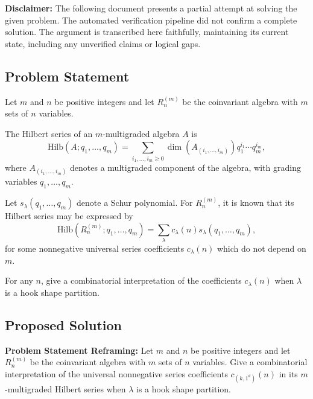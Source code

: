 \documentclass[12pt]{article}
\begin{document}

\date{}



\begin{center}
    \textbf{Disclaimer:} The following document presents a partial attempt at solving the given problem. The automated verification pipeline did not confirm a complete solution. The argument is transcribed here faithfully, maintaining its current state, including any unverified claims or logical gaps.
\end{center}

\subsection*{Problem Statement}

Let $m$ and $n$ be positive integers and let $R_n^{(m)}$ be the coinvariant algebra with $m$ sets of $n$ variables.

The Hilbert series of an $m$-multigraded algebra $A$ is
\[
\mathrm{Hilb}(A;q_1,\ldots ,q_m)= \sum_{i_1,\ldots,i_m \geq 0} \dim(A_{(i_1,\ldots,i_m)})q_1^{i_1} \cdots q_m^{i_m},
\]
where $A_{(i_1,\ldots,i_m)}$ denotes a multigraded component of the algebra, with grading variables $q_1,\ldots, q_m$.

Let $s_\lambda(q_1,\ldots ,q_m)$ denote a Schur polynomial. For $R_n^{(m)}$, it is known that its Hilbert series may be expressed by 
\[
\mathrm{Hilb}(R_n^{(m)};q_1,\ldots ,q_m)= \sum_{\lambda}
c_{\lambda}(n)s_\lambda(q_1,\ldots ,q_m),
\]
for some nonnegative universal series coefficients $c_\lambda(n)$ which do not depend on $m$.

For any $n$, give a combinatorial interpretation of the coefficients $c_{\lambda}(n)$ when $\lambda$ is a hook shape partition.

\subsection*{Proposed Solution}

\textbf{Problem Statement Reframing:} Let $m$ and $n$ be positive integers and let $R_n^{(m)}$ be the coinvariant algebra with $m$ sets of $n$ variables. Give a combinatorial interpretation of the universal nonnegative series coefficients $c_{(k, 1^d)}(n)$ in its $m$-multigraded Hilbert series when $\lambda$ is a hook shape partition.
\end{document}

